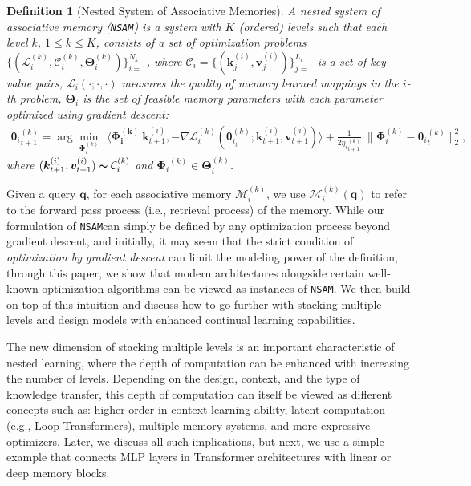 \documentclass{article}
\newcommand{\vv}{\mathbf{v}}
\newtheorem{dfn}{Definition}
\newcommand{\inner}[2]{\langle #1, #2 \rangle}
\newcommand{\M}[0]{\mathcal{M}}
\newcommand{\vk}{\boldsymbol{k}}
\newcommand{\vq}{\boldsymbol{q}}
\renewcommand{\vv}{\boldsymbol{v}}
\newcommand{\nsam}{\texttt{NSAM}}
\begin{document}
\begin{dfn}[Nested System of Associative Memories] \label{dfn:nsam}
    A nested system of associative memory (\nsam) is a system with $K$ (ordered) levels such that each level $k$, $1 \leq k \leq K$, consists of a set of optimization problems $\{ (\mathcal{L}^{(k)}_{i},  \mathcal{C}^{(k)}_i, \boldsymbol{\Theta}^{(k)}_{i}) \}_{i = 1}^{N_k}$, where $\mathcal{C}_i = \{(\vk^{(i)}_j, \vv^{(i)}_j) \}_{j = 1}^{L_{i}}$ is a set of key-value pairs, $\mathcal{L}_{i}(\cdot; \cdot, \cdot)$  measures the quality of memory learned mappings in the $i$-th problem, $\boldsymbol{\Theta}_{i}$ is the set of feasible memory parameters with each parameter optimized using gradient descent:
    \begin{align}
        {\boldsymbol{\theta}_{i}}^{(k)}_{t+1} = \arg\min_{\boldsymbol{\Phi}^{(k)}_{i}} \:\:  \inner{\boldsymbol{\Phi_{i}^{(k)}} \: \vk^{(i)}_{t+1}}{- \nabla \mathcal{L}^{(k)}_i(\boldsymbol{\theta}^{(k)}_{i_t}; \vk^{(i)}_{t+1}, \vv^{(i)}_{t+1})} + \frac{1}{2{\eta_{i}}^{(k)}_{t+1}}\:\|\boldsymbol{\Phi}^{(k)}_{i} - {\boldsymbol{\theta}_{i}}^{(k)}_{t} \|^{2}_2,
    \end{align}
    where $(\vk^{(i)}_{t+1}, \vv^{(i)}_{t+1}) \thicksim \mathcal{C}^{(k)}_i$ and ${\boldsymbol{\Phi}_{i}}^{(k)} \in  \boldsymbol{\Theta}^{(k)}_{i}$. 
\end{dfn} 

Given a query $\vq$, for each associative memory $\M_{i}^{(k)}$,
we use $\M_{i}^{(k)}(\vq)$ to refer to the forward pass process (i.e., retrieval process) of the memory. While our formulation of \nsam can simply be defined by any optimization process beyond gradient descent, and initially, it may seem that the strict condition of \emph{optimization by gradient descent} can limit the modeling power of the definition, through this paper, we show that modern architectures alongside certain well-known optimization algorithms can be viewed as instances of \nsam. We then build on top of this intuition and discuss how to go further with stacking multiple levels and design models with enhanced continual learning capabilities. 

The new dimension of stacking multiple levels is an important characteristic of nested learning, where the depth of computation can be enhanced with increasing the number of levels. Depending on the design, context, and the type of knowledge transfer, this depth of computation can itself be viewed as different concepts such as: higher-order in-context learning ability, latent computation (e.g., Loop Transformers), multiple memory systems, and more expressive optimizers. Later, we discuss all such implications, but next, we use a simple example that connects MLP layers in Transformer architectures with linear or deep memory blocks.
\end{document}
